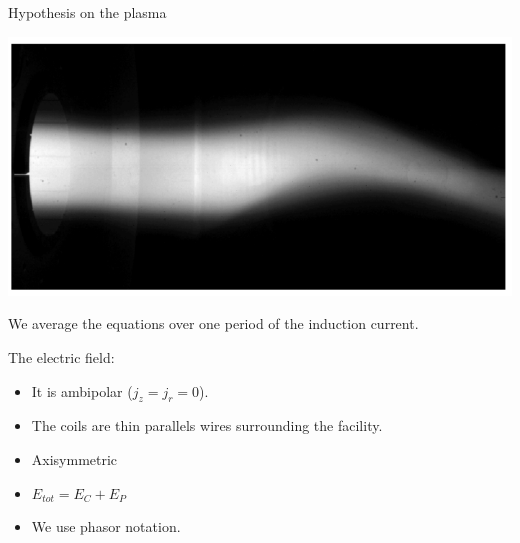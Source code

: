 \documentclass[24pt,t,table, aspectratio=169]{beamer}
\begin{document}
\begin{frame}{Hypothesis on the plasma}
\begin{minipage}{.39\linewidth}
{
\includegraphics[width=\linewidth]{./plasma_jet_unsteady_experimental.png}

We average the equations over one period of the induction current. 
}

{
The electric field:

\begin{itemize}

\item It is ambipolar ($j_z = j_r = 0$).

\item The coils are thin parallels wires surrounding the facility.

\item Axisymmetric

\item $E_{tot} = E_C + E_P$

\item We use phasor notation.

\end{itemize}
}

\end{minipage}

\end{frame}
\end{document}
